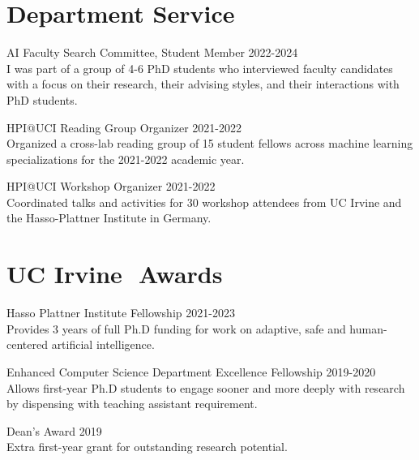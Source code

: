 \documentclass[margin]{res}
\begin{document}
\begin{resume}
\section{Department Service}



AI Faculty Search Committee, Student Member \hfill 2022-2024\\
I was part of a group of 4-6 PhD students who interviewed faculty candidates with a focus on their research, their advising styles, and their interactions with PhD students. 

HPI@UCI Reading Group Organizer \hfill 2021-2022\\
Organized a cross-lab reading group of 15 student fellows across machine learning specializations for the 2021-2022 academic year.

HPI@UCI Workshop Organizer \hfill 2021-2022\\
Coordinated talks and activities for 30 workshop attendees from UC Irvine and the Hasso-Plattner Institute in Germany.

\section{UC Irvine\,\, Awards}

Hasso Plattner Institute Fellowship \hfill 2021-2023\\
Provides 3 years of full Ph.D funding for work on adaptive, safe and human-centered artificial intelligence.

Enhanced Computer Science Department Excellence Fellowship \hfill 2019-2020\\
Allows first-year Ph.D students to engage sooner and more deeply with research by dispensing with teaching assistant requirement.

Dean's Award \hfill 2019\\
Extra first-year grant for outstanding research potential.



\end{resume}
\end{document}
